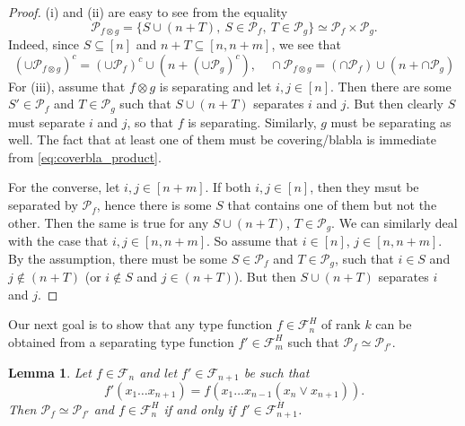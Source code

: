 \documentclass[12pt]{article}
\newtheorem{lemma}{Lemma}
\theoremstyle{definition}
\theoremstyle{remark}
\def\Pe{\mathcal P}
\def\Fe{\mathcal F}
\begin{document}
\begin{proof} 
(i) and (ii) are easy to see from the equality
\[
\Pe_{f\otimes g}=\{S\cup (n+T),\ S\in \Pe_f,\ T\in \Pe_g\}\simeq \Pe_f\times \Pe_g.
\]
Indeed, since $S\subseteq [n]$ and $n+T\subseteq [n,n+m]$, we see that 
\begin{equation}\label{eq:coverbla_product}
(\cup \Pe_{f\otimes g})^c=(\cup \Pe_f)^c\cup (n+(\cup\Pe_g)^c), \quad \cap \Pe_{f\otimes g}=(\cap \Pe_f)\cup (n+\cap\Pe_g)
\end{equation}
For (iii), assume that $f\otimes g$ is separating and let $i,j\in [n]$. Then there are
some $S'\in \Pe_f$ and $T\in \Pe_g$ such that $S\cup (n+T)$ separates $i$ and $j$. But
then clearly $S$ must separate $i$ and $j$, so that $f$ is separating. Similarly, $g$ must
be separating as well. The fact that at least one of them must be covering/blabla is
immediate from \eqref{eq:coverbla_product}. 
 
 For the converse, let $i,j\in [n+m]$. If both $i,j\in [n]$, then they msut be separated
 by $\Pe_f$, hence there is some $S$ that contains one of them but not the other. Then the
 same is true for any $S\cup (n+T)$, $T\in \Pe_g$. We can similarly deal with the case
 that $i,j\in [n,n+m]$. So assume that $i\in [n]$, $j\in [n,n+m]$. By the assumption,
 there must be some $S\in \Pe_f$ and $T\in \Pe_g$, such that $i\in S$ and $j\notin (n+T)$
 (or $i\notin S$ and $j\in (n+T)$). But then $S\cup (n+T)$ separates $i$ and $j$. 

 
\end{proof}




Our next goal is to show that any type function $f\in \Fe_n^H$ of rank $k$ can be obtained 
from a separating type function  $f'\in \Fe_m^H$ such that $\Pe_f\simeq \Pe_{f'}$.


\begin{lemma}\label{lemma:separ} Let $f\in \Fe_n$ and let $f'\in \Fe_{n+1}$
be such that 
\[
f'(x_1\dots x_{n+1})=f(x_1 \dots x_{n-1}(x_n\vee x_{n+1})).
\]
Then $\Pe_f\simeq \Pe_{f'}$ and $f\in \Fe_n^H$ if and only if $f'\in \Fe_{n+1}^H$.

\end{lemma}
\end{document}

